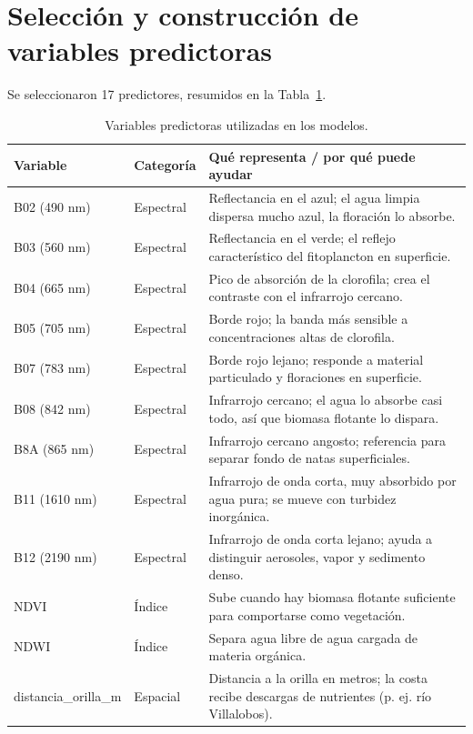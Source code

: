 \documentclass[11pt]{article}
\begin{document}
\section{Selección y construcción de variables predictoras}
\label{sec:predictores}

Se seleccionaron 17 predictores, resumidos en la Tabla~\ref{tab:predictores}.

\begin{table}[H]
\centering
\small
\caption{Variables predictoras utilizadas en los modelos.}
\label{tab:predictores}
\begin{tabular}{p{2.6cm}p{1.8cm}p{8.8cm}}
\toprule
Variable & Categoría & Qué representa / por qué puede ayudar \\
\midrule
B02 (490 nm) & Espectral & Reflectancia en el azul; el agua limpia dispersa mucho azul, la floración lo absorbe. \\
B03 (560 nm) & Espectral & Reflectancia en el verde; el reflejo característico del fitoplancton en superficie. \\
B04 (665 nm) & Espectral & Pico de absorción de la clorofila; crea el contraste con el infrarrojo cercano. \\
B05 (705 nm) & Espectral & Borde rojo; la banda más sensible a concentraciones altas de clorofila. \\
B07 (783 nm) & Espectral & Borde rojo lejano; responde a material particulado y floraciones en superficie. \\
B08 (842 nm) & Espectral & Infrarrojo cercano; el agua lo absorbe casi todo, así que biomasa flotante lo dispara. \\
B8A (865 nm) & Espectral & Infrarrojo cercano angosto; referencia para separar fondo de natas superficiales. \\
B11 (1610 nm) & Espectral & Infrarrojo de onda corta, muy absorbido por agua pura; se mueve con turbidez inorgánica. \\
B12 (2190 nm) & Espectral & Infrarrojo de onda corta lejano; ayuda a distinguir aerosoles, vapor y sedimento denso. \\
NDVI & Índice & Sube cuando hay biomasa flotante suficiente para comportarse como vegetación. \\
NDWI & Índice & Separa agua libre de agua cargada de materia orgánica. \\
distancia\_\newline orilla\_m & Espacial & Distancia a la orilla en metros; la costa recibe descargas de nutrientes (p. ej. río Villalobos). \\

\end{tabular}
\end{table}
\end{document}
